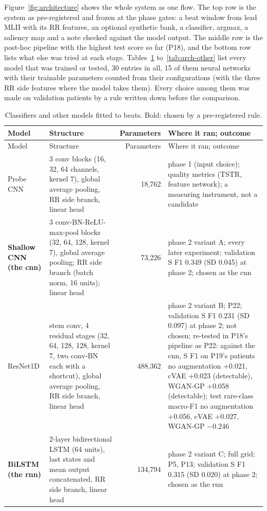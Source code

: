 Figure~\ref{fig:architecture} shows the whole system as one flow. The top row is the system as pre-registered and frozen at the phase gates: a beat window from lead MLII with its RR features, an optional synthetic bank, a classifier, argmax, a saliency map and a note checked against the model output. The middle row is the post-hoc pipeline with the highest test score so far (P18), and the bottom row lists what else was tried at each stage. Tables~\ref{tab:arch-classifiers} to~\ref{tab:arch-other} list every model that was trained or tested, 30 entries in all, 15 of them neural networks with their trainable parameters counted from their configurations (with the three RR side features where the model takes them). Every choice among them was made on validation patients by a rule written down before the comparison.
\begingroup\footnotesize
\begin{longtable}{p{2.6cm}p{6.1cm}rp{4.6cm}}
\caption{Classifiers and other models fitted to beats. Bold: chosen by a pre-registered rule.}\label{tab:arch-classifiers}\\
\toprule
Model & Structure & Parameters & Where it ran; outcome \\
\midrule
\endfirsthead
\toprule
Model & Structure & Parameters & Where it ran; outcome \\
\midrule
\endhead
\bottomrule
\endfoot
Probe CNN & 3 conv blocks (16, 32, 64 channels, kernel 7), global average pooling, RR side branch, linear head & 18,762 & phase 1 (input choice); quality metrics (TSTR, feature network); a measuring instrument, not a candidate \\
\textbf{Shallow CNN (the cnn)} & 3 conv-BN-ReLU-max-pool blocks (32, 64, 128, kernel 7), global average pooling; RR side branch (batch norm, 16 units); linear head & 73,226 & phase 2 variant A; every later experiment; validation S F1 0.349 (SD 0.045) at phase 2; chosen as the cnn \\
ResNet1D & stem conv, 4 residual stages (32, 64, 128, 128, kernel 7, two conv-BN each with a shortcut), global average pooling, RR side branch, linear head & 488,362 & phase 2 variant B; P22; validation S F1 0.231 (SD 0.097) at phase 2; not chosen; re-tested in P18's pipeline as P22: against the cnn, S F1 on P19's patients no augmentation +0.021, cVAE +0.023 (detectable), WGAN-GP +0.058 (detectable); test rare-class macro-F1 no augmentation +0.056, cVAE +0.027, WGAN-GP $-$0.246 \\
\textbf{BiLSTM (the rnn)} & 2-layer bidirectional LSTM (64 units), last states and mean output concatenated, RR side branch, linear head & 134,794 & phase 2 variant C; full grid; P5, P13; validation S F1 0.315 (SD 0.020) at phase 2; chosen as the rnn \\

\end{longtable}
